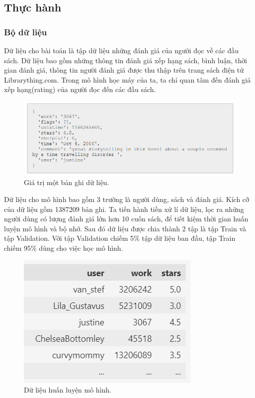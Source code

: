 \subsection{Thực hành}
\subsubsection{Bộ dữ liệu}
Dữ liệu cho bài toán là tập dữ liệu những đánh giá của người đọc về các đầu sách. Dữ liệu bao gồm những thông tin đánh giá xếp hạng sách, bình luận, thời gian đánh giá, thông tin người đánh giá được thu thập trên trang sách điện tử Librarything.com. Trong mô hình học máy của ta, ta chỉ quan tâm đến đánh giá xếp hạng(rating) của người đọc đến các đầu sách.
\begin{figure}[H]
    \centering
    \includegraphics[scale = .7]{images/data_img.png}
    \caption{Giá trị một bản ghi dữ liệu.}
\end{figure}

Dữ liệu cho mô hình bao gồm 3 trường là người dùng, sách và đánh giá.
Kích cỡ của dữ liệu gồm 1387209 bản ghi. Ta tiến hành tiền xử lí dữ liệu, lọc ra những người dùng có lượng đánh giá lớn hơn 10 cuốn sách, để tiết kiệm thời gian huấn luyện mô hình và bộ nhớ. Sau đó dữ liệu được chia thành 2 tập là tập Train và tập Validation. Với tập Validation chiếm 5\% tập dữ liệu ban đầu, tập Train chiếm 95\% dùng cho việc học mô hình.
\begin{figure}[H]
    \centering
    \includegraphics{images/Screenshot 2022-07-30 181900.png}
    \caption{Dữ liệu huấn luyện mô hình.}
\end{figure}

